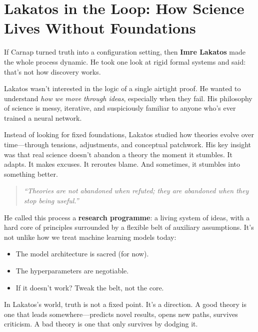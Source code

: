 \section{Lakatos in the Loop: How Science Lives Without Foundations}

If Carnap turned truth into a configuration setting, then \textbf{Imre Lakatos} made the whole process dynamic. He took one look at rigid formal systems and said: that’s not how discovery works.

Lakatos wasn’t interested in the logic of a single airtight proof. He wanted to understand \textit{how we move through ideas}, especially when they fail. His philosophy of science is messy, iterative, and suspiciously familiar to anyone who's ever trained a neural network.

Instead of looking for fixed foundations, Lakatos studied how theories evolve over time—through tensions, adjustments, and conceptual patchwork. His key insight was that real science doesn’t abandon a theory the moment it stumbles. It adapts. It makes excuses. It reroutes blame. And sometimes, it stumbles into something better.

\begin{quote}
    \textit{“Theories are not abandoned when refuted; they are abandoned when they stop being useful.”}
\end{quote}

He called this process a \textbf{research programme}: a living system of ideas, with a hard core of principles surrounded by a flexible belt of auxiliary assumptions. It’s not unlike how we treat machine learning models today:

\begin{itemize}
  \item The model architecture is sacred (for now).
  \item The hyperparameters are negotiable.
  \item If it doesn’t work? Tweak the belt, not the core.
\end{itemize}

In Lakatos’s world, truth is not a fixed point. It’s a direction. A good theory is one that leads somewhere—predicts novel results, opens new paths, survives criticism. A bad theory is one that only survives by dodging it.

\vspace{1em}

